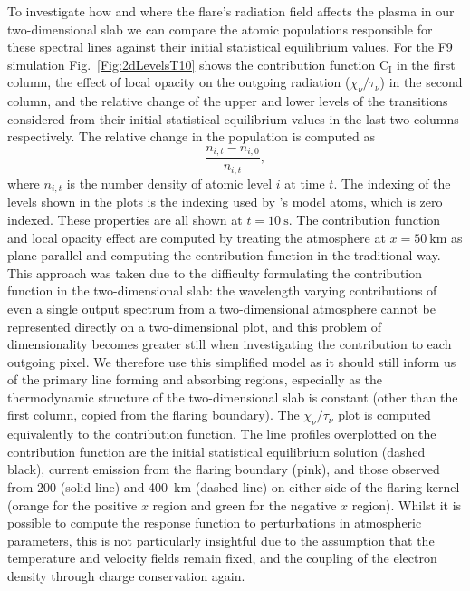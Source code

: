 To investigate how and where the flare's radiation field affects the plasma in our two-dimensional slab we can compare the atomic populations responsible for these spectral lines against their initial statistical equilibrium values.
For the F9 simulation Fig.~\ref{Fig:2dLevelsT10} shows the contribution function $\mathrm{C}_\mathrm{I}$ in the first column, the effect of local opacity on the outgoing radiation ($\chi_\nu/\tau_\nu$) in the second column, and the relative change of the upper and lower levels of the transitions considered from their initial statistical equilibrium values in the last two columns respectively.
The relative change in the population is computed as
\begin{equation}
    \frac{n_{i, t} - n_{i, 0}}{n_{i, t}},
\end{equation}
where $n_{i,t}$ is the number density of atomic level $i$ at time $t$.
The indexing of the levels shown in the plots is the indexing used by \Lw{}'s model atoms, which is zero indexed.
These properties are all shown at $t=\SI{10}{\second}$.
The contribution function and local opacity effect are computed by treating the atmosphere at $x=\SI{50}{\kilo\metre}$ as plane-parallel and computing the contribution function in the traditional way.
This approach was taken due to the difficulty formulating the contribution function in the two-dimensional slab: the wavelength varying contributions of even a single output spectrum from a two-dimensional atmosphere cannot be represented directly on a two-dimensional plot, and this problem of dimensionality becomes greater still when investigating the contribution to each outgoing pixel.
We therefore use this simplified model as it should still inform us of the primary line forming and absorbing regions, especially as the thermodynamic structure of the two-dimensional slab is constant (other than the first column, copied from the flaring boundary).
The $\chi_\nu / \tau_\nu$ plot is computed equivalently to the contribution function.
The line profiles overplotted on the contribution function are the initial statistical equilibrium solution (dashed black), current emission from the flaring boundary (pink), and those observed from 200 (solid line) and \SI{400}{\kilo\metre} (dashed line) on either side of the flaring kernel (orange for the positive $x$ region and green for the negative $x$ region).
Whilst it is possible to compute the response function to perturbations in atmospheric parameters, this is not particularly insightful due to the assumption that the temperature and velocity fields remain fixed, and the coupling of the electron density through charge conservation again.

